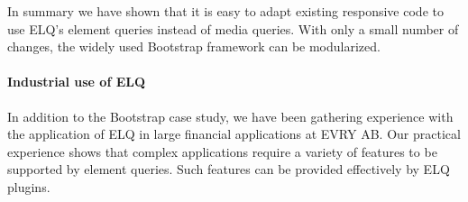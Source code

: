 \documentclass{acm_proc_article-sp}
\newcommand{\code}[1]{\texttt{#1}}
\newcommand{\elq}{ELQ}
\newcommand{\gls}[1]{#1}
\begin{document}

    In summary we have shown that it is easy to adapt existing responsive code to use \elq{}'s element queries instead of media queries.
    With only a small number of changes, the widely used Bootstrap framework can be modularized.

    \paragraph{Industrial use of \elq{}}
    In addition to the Bootstrap case study, we have been gathering experience with the application of \elq{} in large financial applications at EVRY AB.
    Our practical experience shows that complex applications require a variety of features to be supported by element queries.
    Such features can be provided effectively by \elq{} plugins.
\end{document}
